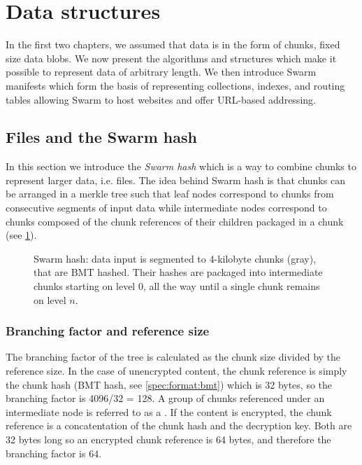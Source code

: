 \section{Data structures}\label{sec:datastructures}

\green{}

In the first two chapters, we assumed that data is in the form of chunks, fixed size data blobs. We now present the algorithms and structures which make it possible to represent data of arbitrary length. We then introduce Swarm manifests which form the basis of representing collections, indexes, and routing tables allowing Swarm to host websites and offer URL-based addressing.

\subsection{Files and the Swarm hash}\label{sec:files}

In this section we introduce the \emph{Swarm hash} which is a way to combine chunks to represent larger data, i.e. files. The idea behind Swarm hash is that chunks can be arranged in a merkle tree such that leaf nodes correspond to chunks from consecutive segments of input data while intermediate nodes correspond to chunks composed of the chunk references of their children packaged in a chunk (see \ref{fig:Swarm-hash}). 



\begin{figure}[htbp]
\centering
\resizebox{1\textwidth}{!}{
    
}
\caption[Swarm hash]{Swarm hash: data input is segmented to 4-kilobyte chunks (gray), that are BMT hashed. Their hashes are packaged into intermediate chunks starting on level 0, all the way until a single chunk remains on level $n$. }
\label{fig:Swarm-hash}
\end{figure}

\subsubsection{Branching factor and reference size}

The branching factor of the tree is calculated as the chunk size divided by the reference size. In the case of unencrypted content, the chunk reference is simply the chunk hash (BMT hash, see \ref{spec:format:bmt}) which is 32 bytes, so the branching factor is 4096/32 =  128. A group of chunks referenced under an intermediate node is referred to as a . If the content is encrypted, the chunk reference is a concatentation of the chunk hash and the decryption key. Both are 32 bytes long so an encrypted chunk reference is 64 bytes, and therefore the branching factor is 64. 

